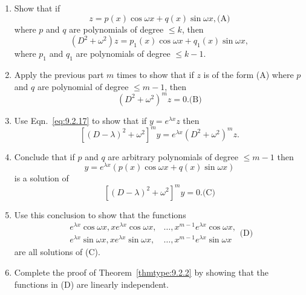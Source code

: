 \documentclass{ximera}
\begin{document}
\begin{problem}\label{exer:9.2.41}
\begin{enumerate}
\item %
Show that if
$$
z=p(x)\cos\omega x+q(x)\sin\omega x,
\text{(A)}
$$
where $p$ and $q$ are polynomials of degree $\le k$, then
$$
(D^2+\omega^2)z=p_1(x)\cos\omega x+q_1(x)\sin\omega x,
$$
where $p_1$ and $q_1$ are polynomials of degree $\le k-1$.

\item %
Apply the previous part $m$ times to show that if $z$ is of
the form (A) where $p$ and $q$ are polynomial of
degree $\le m-1$, then
$$
(D^2+\omega^2)^mz=0.
\text{(B)}
$$

\item %
Use Eqn.~\eqref{eq:9.2.17} to show that if $y=e^{\lambda x}z$ then
$$
[(D-\lambda)^2+\omega^2]^my=e^{\lambda
x}(D^2+\omega^2)^mz.
$$

\item %
Conclude that if $p$ and $q$ are arbitrary polynomials of degree $\le m-1$ then
$$
y=e^{\lambda x}(p(x)\cos\omega x+q(x)\sin\omega x)
$$
is a solution of
$$
[(D-\lambda)^2+\omega^2]^my=0.
\text{(C)}
$$

\item %
Use this conclusion to show that the functions
$$
\begin{array}{rl}
e^{\lambda x}\cos\omega x, xe^{\lambda x}\cos\omega x,
&\dots, x^{m-1}e^{\lambda x}\cos\omega x,\\
e^{\lambda x}\sin\omega x, xe^{\lambda x}\sin\omega x,&
\dots, x^{m-1}e^{\lambda x}\sin\omega x
\end{array}
\text{(D)}
$$
are all solutions of (C).

\item %
Complete the proof of Theorem~\ref{thmtype:9.2.2} by showing that the
functions in (D) are linearly independent.
\end{enumerate}
\end{problem}
\end{document}
